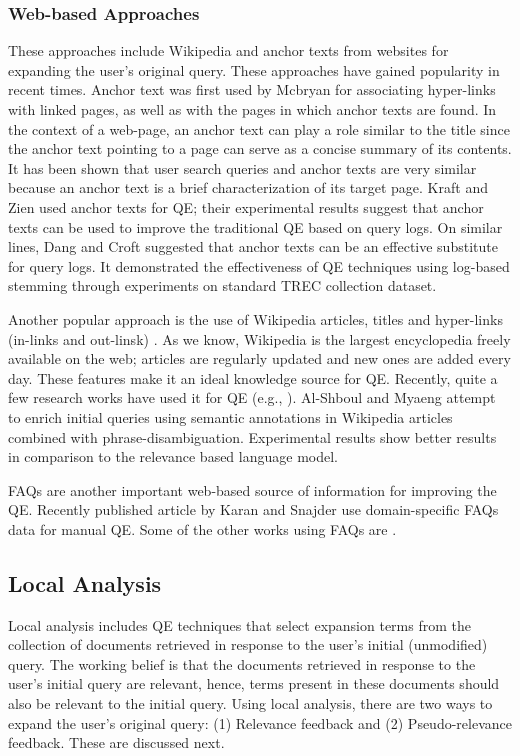 \subsubsection{Web-based Approaches}
These approaches include Wikipedia and anchor texts from websites  for expanding the user's original query. These approaches have gained popularity in recent times.  Anchor text was first used by Mcbryan \cite{mcbryan1994genvl} for associating  hyper-links with linked pages, as well as with the pages in which anchor texts are found. In the context of a web-page, an anchor text can play a role similar to the title since the anchor text pointing to a page can serve as a concise summary of its contents. It has been shown that user search queries and anchor texts are very similar because an anchor text is a brief characterization of its target page. Kraft and Zien \cite{kraft2004mining} used anchor texts for QE; their experimental results suggest that  anchor texts can be used to improve the traditional QE based on query logs. On similar lines, Dang and Croft \cite{dang2010query} suggested that anchor texts can be an effective substitute for query logs. It demonstrated the effectiveness of QE techniques using log-based stemming through experiments on standard TREC collection dataset.

Another popular approach is the use of Wikipedia articles, titles and hyper-links (in-links and out-linsk) \cite{arguello2008document,almasri2013wikipedia}. As we know, Wikipedia is the largest encyclopedia freely available on the web; articles are regularly updated and new ones are added every day. These features make it an ideal knowledge source for QE. Recently, quite a few research works have used it for QE (e.g., \cite{li2007improving,arguello2008document,xu2009query,aggarwal2012query,almasri2013wikipedia}). Al-Shboul and Myaeng \cite{al2014wikipedia} attempt  to enrich initial queries using semantic annotations in Wikipedia articles combined with phrase-disambiguation. Experimental results show better results in comparison to the relevance based language model.

FAQs are another important web-based source of information  for improving the QE. Recently published article by Karan and Snajder \cite{karan2015evaluation} use domain-specific FAQs data for manual QE. Some of the other works using FAQs are  \cite{agichtein2004learning,soricut2006automatic,riezler2007statistical}.

\subsection{Local Analysis}
Local analysis includes QE techniques that select expansion terms from the collection of documents retrieved in response to the user's initial (unmodified) query. The working belief is that the documents retrieved in response to the user's initial query are relevant, hence, terms present in these documents should also be relevant to the initial query. Using local analysis, there are two ways to expand the user's original query: (1) Relevance feedback and (2) Pseudo-relevance feedback. These are discussed next. 
